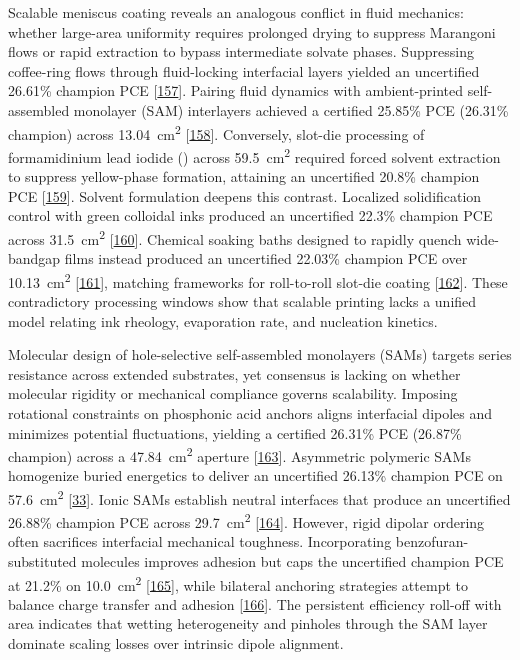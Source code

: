 \documentclass[
  11pt,
]{article}
\begin{document}
Scalable meniscus coating reveals an analogous conflict in fluid
mechanics: whether large-area uniformity requires prolonged drying to
suppress Marangoni flows or rapid extraction to bypass intermediate
solvate phases. Suppressing coffee-ring flows through fluid-locking
interfacial layers yielded an uncertified 26.61\% champion PCE
{[}\href{https://doi.org/10.1002/adma.202518582}{157}{]}. Pairing fluid
dynamics with ambient-printed self-assembled monolayer (SAM) interlayers
achieved a certified 25.85\% PCE (26.31\% champion) across
\qty{13.04}{\centi\meter\squared}
{[}\href{https://doi.org/10.1002/adma.73373}{158}{]}. Conversely,
slot-die processing of formamidinium lead iodide () across
\qty{59.5}{\centi\meter\squared} required forced solvent extraction to
suppress yellow-phase formation, attaining an uncertified 20.8\%
champion PCE {[}\href{https://doi.org/10.1021/acsami.5c22032}{159}{]}.
Solvent formulation deepens this contrast. Localized solidification
control with green colloidal inks produced an uncertified 22.3\%
champion PCE across \qty{31.5}{\centi\meter\squared}
{[}\href{https://doi.org/10.1002/aenm.202504928}{160}{]}. Chemical
soaking baths designed to rapidly quench wide-bandgap films instead
produced an uncertified 22.03\% champion PCE over
\qty{10.13}{\centi\meter\squared}
{[}\href{https://doi.org/10.1038/s41467-026-69264-9}{161}{]}, matching
frameworks for roll-to-roll slot-die coating
{[}\href{https://doi.org/10.1002/advs.202522103}{162}{]}. These
contradictory processing windows show that scalable printing lacks a
unified model relating ink rheology, evaporation rate, and nucleation
kinetics.

Molecular design of hole-selective self-assembled monolayers (SAMs)
targets series resistance across extended substrates, yet consensus is
lacking on whether molecular rigidity or mechanical compliance governs
scalability. Imposing rotational constraints on phosphonic acid anchors
aligns interfacial dipoles and minimizes potential fluctuations,
yielding a certified 26.31\% PCE (26.87\% champion) across a
\qty{47.84}{\centi\meter\squared} aperture
{[}\href{https://doi.org/10.1002/aenm.71068}{163}{]}. Asymmetric
polymeric SAMs homogenize buried energetics to deliver an uncertified
26.13\% champion PCE on \qty{57.6}{\centi\meter\squared}
{[}\href{https://doi.org/10.1038/s41467-026-73276-w}{33}{]}. Ionic SAMs
establish neutral interfaces that produce an uncertified 26.88\%
champion PCE across \qty{29.7}{\centi\meter\squared}
{[}\href{https://doi.org/10.1038/s41467-026-74288-2}{164}{]}. However,
rigid dipolar ordering often sacrifices interfacial mechanical
toughness. Incorporating benzofuran-substituted molecules improves
adhesion but caps the uncertified champion PCE at 21.2\% on
\qty{10.0}{\centi\meter\squared}
{[}\href{https://doi.org/10.1002/smll.74000}{165}{]}, while bilateral
anchoring strategies attempt to balance charge transfer and adhesion
{[}\href{https://doi.org/10.1002/aenm.71001}{166}{]}. The persistent
efficiency roll-off with area indicates that wetting heterogeneity and
pinholes through the SAM layer dominate scaling losses over intrinsic
dipole alignment.
\end{document}
